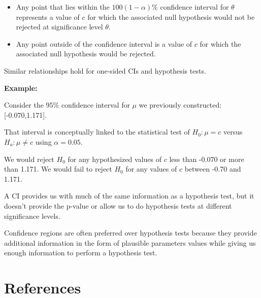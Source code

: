 \documentclass[
]{book}
\providecommand{\tightlist}{%
  \setlength{\itemsep}{0pt}\setlength{\parskip}{0pt}}
\theoremstyle{definition}
\theoremstyle{definition}
\theoremstyle{definition}
\theoremstyle{definition}
\theoremstyle{remark}
\begin{document}
\begin{itemize}
\tightlist
\item
  Any point that lies within the \(100(1-\alpha)\%\) confidence interval for \(\theta\) represents a value of \(c\) for which the associated null hypothesis would not be rejected at significance level \(\theta\).
\item
  Any point outside of the confidence interval is a value of \(c\) for which the associated null hypothesis would be rejected.
\end{itemize}

Similar relationships hold for one-sided CIs and hypothesis tests.

\textbf{Example:}

Consider the 95\% confidence interval for \(\mu\) we previously
constructed: {[}-0.070,1.171{]}.

That interval is conceptually linked to the statistical test of \(H_0:\mu = c\) versus \(H_a:\mu \neq c\) using \(\alpha =0.05\).

We would reject \(H_0\) for any hypothesized values of \(c\) less than -0.070 or more than 1.171. We would fail to reject \(H_0\) for any values of \(c\) between -0.70 and 1.171.

A CI provides us with much of the same information as a hypothesis test, but it doesn't provide the p-value or allow us to do hypothesis tests at different significance levels.

Confidence regions are often preferred over hypothesis tests because they provide additional information in the form of plausible parameters values while giving us enough information to perform a hypothesis test.

\hypertarget{references}{%
\chapter*{References}\label{references}}
\end{document}
